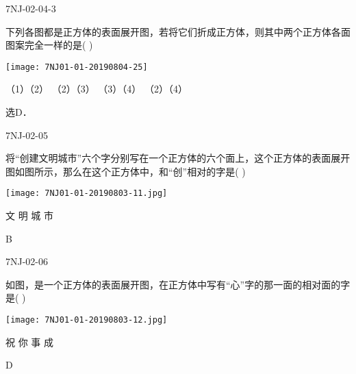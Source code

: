 \begin{defproblem}{7NJ-02-04-3}%
\begin{onlyproblem}%
下列各图都是正方体的表面展开图，若将它们折成正方体，则其中两个正方体各面图案完全一样的是(    ) 
\begin{center}
\texttt{[image: 7NJ01-01-20190804-25]}
\end{center}

\xx
{（1）（2）}
{（2）（3）}
{（3）（4）}
{（2）（4）}
  
\end{onlyproblem}%
\begin{onlysolution}%
\begin{solution}%
选D． 
\end{solution}%
\end{onlysolution}%
\end{defproblem}



\begin{defproblem}{7NJ-02-05}%
\begin{onlyproblem}%
将“创建文明城市”六个字分别写在一个正方体的六个面上，这个正方体的表面展开图如图所示，那么在这个正方体中，和“创”相对的字是(    ) 
\begin{center}
\texttt{[image: 7NJ01-01-20190803-11.jpg]}
\end{center}

\xx
{文}
{明}
{城}
{市}

\end{onlyproblem}%
\begin{onlysolution}%
\begin{solution}%
B
\end{solution}%
\end{onlysolution}%
\end{defproblem}




\begin{defproblem}{7NJ-02-06}%
\begin{onlyproblem}%
如图，是一个正方体的表面展开图，在正方体中写有“心”字的那一面的相对面的字是(    ) 
\begin{center}
\texttt{[image: 7NJ01-01-20190803-12.jpg]}
\end{center}

\xx
{祝}
{你}
{事}
{成}

\end{onlyproblem}%
\begin{onlysolution}%
\begin{solution}%
D
\end{solution}%
\end{onlysolution}%
\end{defproblem}




